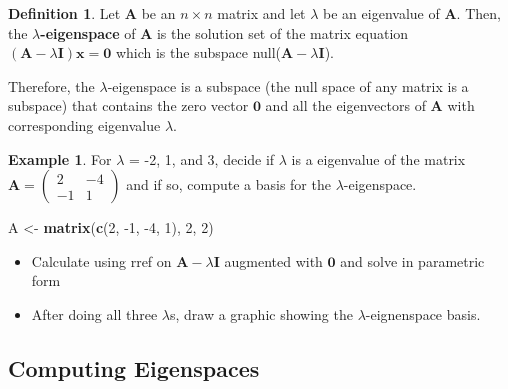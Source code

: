 \documentclass[
]{book}
\newenvironment{Shaded}{\begin{snugshade}}{\end{snugshade}}
\newcommand{\DecValTok}[1]{\textcolor[rgb]{0.00,0.00,0.81}{#1}}
\newcommand{\KeywordTok}[1]{\textcolor[rgb]{0.13,0.29,0.53}{\textbf{#1}}}
\newcommand{\NormalTok}[1]{#1}
\newcommand{\StringTok}[1]{\textcolor[rgb]{0.31,0.60,0.02}{#1}}
\theoremstyle{definition}
\newtheorem{definition}{Definition}[chapter]
\theoremstyle{definition}
\newtheorem{example}{Example}[chapter]
\theoremstyle{definition}
\theoremstyle{definition}
\theoremstyle{remark}
\begin{document}
\begin{definition}
Let \(\mathbf{A}\) be an \(n \times n\) matrix and let \(\lambda\) be an eigenvalue of \(\mathbf{A}\). Then, the \textbf{\(\lambda\)-eigenspace} of \(\mathbf{A}\) is the solution set of the matrix equation \(\left( \mathbf{A} - \lambda \mathbf{I} \right) \mathbf{x} = \mathbf{0}\) which is the subspace null(\(\mathbf{A} - \lambda \mathbf{I}\)).
\end{definition}

Therefore, the \(\lambda\)-eigenspace is a subspace (the null space of any matrix is a subspace) that contains the zero vector \(\mathbf{0}\) and all the eigenvectors of \(\mathbf{A}\) with corresponding eigenvalue \(\lambda\).

\begin{example}

For \(\lambda\) = -2, 1, and 3, decide if \(\lambda\) is a eigenvalue of the matrix \(\mathbf{A} = \begin{pmatrix} 2 & -4 \\ -1 & 1 \end{pmatrix}\) and if so, compute a basis for the \(\lambda\)-eigenspace.

\begin{Shaded}
\begin{Highlighting}[]
\NormalTok{A <-}\StringTok{ }\KeywordTok{matrix}\NormalTok{(}\KeywordTok{c}\NormalTok{(}\DecValTok{2}\NormalTok{, }\DecValTok{-1}\NormalTok{, }\DecValTok{-4}\NormalTok{, }\DecValTok{1}\NormalTok{), }\DecValTok{2}\NormalTok{, }\DecValTok{2}\NormalTok{)}
\end{Highlighting}
\end{Shaded}

\begin{itemize}
\item
  Calculate using rref on \(\mathbf{A} - \lambda \mathbf{I}\) augmented with \(\mathbf{0}\) and solve in parametric form
\item
  After doing all three \(\lambda\)s, draw a graphic showing the \(\lambda\)-eignenspace basis.
\end{itemize}

\end{example}

\hypertarget{computing-eigenspaces}{%
\subsection{Computing Eigenspaces}\label{computing-eigenspaces}}
\end{document}
